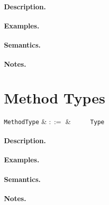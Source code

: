 \paragraph{Description.}  

\paragraph{Examples.}

\paragraph{Semantics.}

\paragraph{Notes.}


\section{Method Types}

\begin{syntax}
  \verb+MethodType+ & $::=$ & \ \token{(}\
  \ \token{)}\ \token{=>}\ \verb+Type+\\
\end{syntax}

\paragraph{Description.}  

\paragraph{Examples.}

\paragraph{Semantics.}

\paragraph{Notes.}


